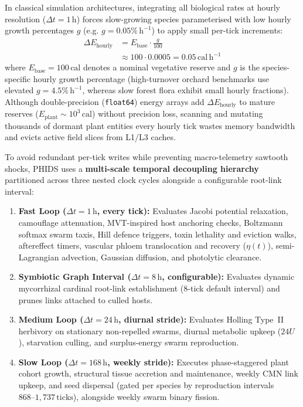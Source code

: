 In classical simulation architectures, integrating all biological rates at hourly resolution ($\Delta t = 1\,\text{h}$) forces slow-growing species parameterised with low hourly growth percentages $g$ (e.g. $g = 0.05\%\,\text{h}^{-1}$) to apply small per-tick increments:
\begin{align}
  \Delta E_{\text{hourly}} &= E_{\text{base}} \cdot \frac{g}{100} \nonumber \\
  &\approx 100 \cdot 0.0005 = 0.05\,\text{cal}\,\text{h}^{-1}
  \label{eq:microscopic_increment}
\end{align}
where $E_{\text{base}} = 100\,\text{cal}$ denotes a nominal vegetative reserve and $g$ is the species-specific hourly growth percentage (high-turnover orchard benchmarks use elevated $g = 4.5\%\,\text{h}^{-1}$, whereas slow forest flora exhibit small hourly fractions). Although double-precision (\texttt{float64}) energy arrays add $\Delta E_{\text{hourly}}$ to mature reserves ($E_{\text{plant}} \sim 10^3\,\text{cal}$) without precision loss, scanning and mutating thousands of dormant plant entities every hourly tick wastes memory bandwidth and evicts active field slices from L1/L3 caches.

To avoid redundant per-tick writes while preventing macro-telemetry sawtooth shocks, PHIDS uses a \textbf{multi-scale temporal decoupling hierarchy} partitioned across three nested clock cycles alongside a configurable root-link interval:
\begin{enumerate}
  \item \textbf{Fast Loop ($\Delta t = 1\,\text{h}$, every tick):} Evaluates Jacobi potential relaxation, camouflage attenuation, MVT-inspired host anchoring checks, Boltzmann softmax swarm taxis, Hill defence triggers, toxin lethality and eviction walks, aftereffect timers, vascular phloem translocation and recovery ($\eta(t)$), semi-Lagrangian advection, Gaussian diffusion, and photolytic clearance.
  \item \textbf{Symbiotic Graph Interval ($\Delta t = 8\,\text{h}$, configurable):} Evaluates dynamic mycorrhizal cardinal root-link establishment ($8$-tick default interval) and prunes links attached to culled hosts.
  \item \textbf{Medium Loop ($\Delta t = 24\,\text{h}$, diurnal stride):} Evaluates Holling Type~II herbivory on stationary non-repelled swarms, diurnal metabolic upkeep ($24 U$), starvation culling, and surplus-energy swarm reproduction.
  \item \textbf{Slow Loop ($\Delta t = 168\,\text{h}$, weekly stride):} Executes phase-staggered plant cohort growth, structural tissue accretion and maintenance, weekly CMN link upkeep, and seed dispersal (gated per species by reproduction intervals $868\text{--}1{,}737\,\text{ticks}$), alongside weekly swarm binary fission.
\end{enumerate}

